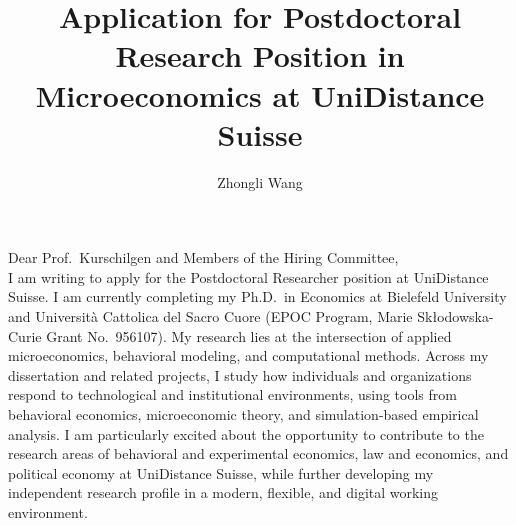 \documentclass{nfr}
\title{Application for Postdoctoral Research Position in Microeconomics at UniDistance Suisse}
\author{Zhongli Wang}
\begin{document}

% 
% 
% 
% 


\maketitle


\noindent Dear Prof.~Kurschilgen and Members of the Hiring Committee,\\[0.2cm]

I am writing to apply for the Postdoctoral Researcher position at UniDistance Suisse. 
I am currently completing my Ph.D.\ in Economics at Bielefeld University and Università Cattolica del Sacro Cuore (EPOC Program, Marie Skłodowska-Curie Grant No.~956107). 
My research lies at the intersection of applied microeconomics, behavioral modeling, and computational methods. 
Across my dissertation and related projects, I study how individuals and organizations respond to technological and institutional environments, using tools from behavioral economics, microeconomic theory, and simulation-based empirical analysis. 
I am particularly excited about the opportunity to contribute to the research areas of behavioral and experimental economics, law and economics, and political economy at UniDistance Suisse, while further developing my independent research profile in a modern, flexible, and digital working environment.\\
\end{document}
